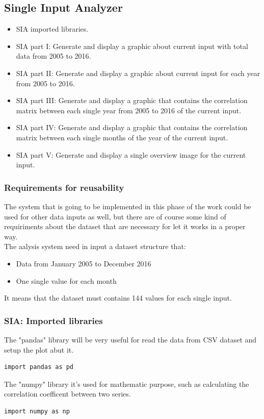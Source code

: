 \newpage
\subsection{Single Input Analyzer}
\begin{itemize}
\item SIA imported libraries.
\item SIA part I: Generate and display a graphic about current input with total data from 2005 to 2016.
\item SIA part II: Generate and display a graphic about current input for each year from 2005 to 2016.
\item SIA part III: Generate and display a graphic that contains the correlation matrix between each single year from 2005 to 2016 of the current input.
\item SIA part IV: Generate and display a graphic that contains the correlation matrix between each single months of the year of the current input.
\item SIA part V: Generate and display a single overview image for the current input.
\end{itemize}

\subsubsection{Requirements for reusability}
The system that is going to be implemented in this phase of the work could be used for other data inputs as well, but there are of course some kind of requiriments about the dataset that are necessary for let it works in a proper way.\\
The aalysis system need in input a dataset structure that:
\begin{itemize}
\item Data from January 2005 to December 2016
\item One single value for each month
\end{itemize}
It means that the dataset must contains 144 values for each single input.
\newpage
\subsubsection{SIA: Imported libraries}
The "pandas" library will be very useful for read the data from CSV dataset and setup the plot abut it.
\begin{lstlisting}
import pandas as pd
\end{lstlisting}

The "numpy" library it's used for mathematic purpose, such as calculating the correlation coefficent between two series.
\begin{lstlisting}
import numpy as np
\end{lstlisting}
 
